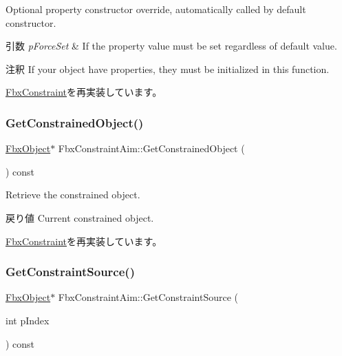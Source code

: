 Optional property constructor override, automatically called by default constructor. 
\begin{DoxyParams}{引数}
{\em p\+Force\+Set} & If the property value must be set regardless of default value. \\
\hline
\end{DoxyParams}
\begin{DoxyRemark}{注釈}
If your object have properties, they must be initialized in this function. 
\end{DoxyRemark}


\hyperlink{class_fbx_constraint_a0470a25b813b337d07a03ce4b97b44f8}{Fbx\+Constraint}を再実装しています。

\mbox{\label{class_fbx_constraint_aim_a7245132b757540df762f9b37dae533cf}} 
\subsubsection{\texorpdfstring{Get\+Constrained\+Object()}{GetConstrainedObject()}}
{\footnotesize\ttfamily \hyperlink{class_fbx_object}{Fbx\+Object}$\ast$ Fbx\+Constraint\+Aim\+::\+Get\+Constrained\+Object (\begin{DoxyParamCaption}{ }\end{DoxyParamCaption}) const\hspace{0.3cm}{\ttfamily [virtual]}}

Retrieve the constrained object. \begin{DoxyReturn}{戻り値}
Current constrained object. 
\end{DoxyReturn}


\hyperlink{class_fbx_constraint_a7f587d5db9685b5ee925a85354263edc}{Fbx\+Constraint}を再実装しています。

\mbox{\label{class_fbx_constraint_aim_ae5d3634ababc5cb0af0734b41c78218a}} 
\subsubsection{\texorpdfstring{Get\+Constraint\+Source()}{GetConstraintSource()}}
{\footnotesize\ttfamily \hyperlink{class_fbx_object}{Fbx\+Object}$\ast$ Fbx\+Constraint\+Aim\+::\+Get\+Constraint\+Source (\begin{DoxyParamCaption}\item[{int}]{p\+Index }\end{DoxyParamCaption}) const\hspace{0.3cm}{\ttfamily [virtual]}}

